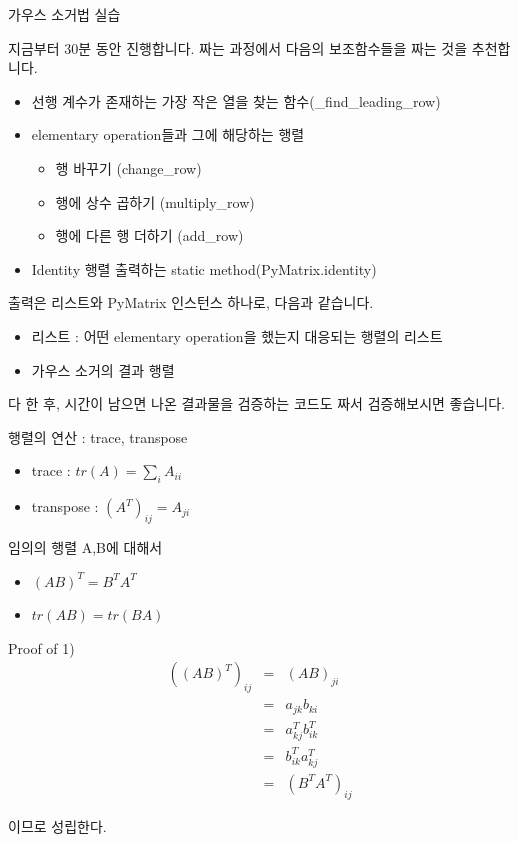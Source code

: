 \documentclass{beamer}
\begin{document}
\begin{frame}[allowframebreaks]{가우스 소거법 실습} 

지금부터 30분 동안 진행합니다. 짜는 과정에서 다음의 보조함수들을 짜는 것을 추천합니다. 

\begin{itemize} 
\item 선행 계수가 존재하는 가장 작은 열을 찾는 함수(\_find\_leading\_row)
\item elementary operation들과 그에 해당하는 행렬 
\begin{itemize} 
\item 행 바꾸기 (change\_row)
\item 행에 상수 곱하기 (multiply\_row)
\item 행에 다른 행 더하기 (add\_row)
\end{itemize}
\item Identity 행렬 출력하는 static method(PyMatrix.identity)
\end{itemize}

출력은 리스트와 PyMatrix 인스턴스 하나로, 다음과 같습니다. 

\begin{itemize} 
\item 리스트 : 어떤 elementary operation을 했는지 대응되는 행렬의 리스트
\item 가우스 소거의 결과 행렬 
\end{itemize}

다 한 후, 시간이 남으면 나온 결과물을 검증하는 코드도 짜서 검증해보시면 좋습니다. 

\end{frame}




\begin{frame}{행렬의 연산 : trace, transpose} 
\begin{itemize} 
\item trace : $tr(A) = \sum_i A_{ii}$
\item transpose : $(A^{T})_{ij} = A_{ji}$
\end{itemize}

임의의 행렬 A,B에 대해서 
\begin{itemize}
\item $(AB)^T = B^TA^T$
\item $tr(AB) = tr(BA)$
\end{itemize}  
\end{frame}

\begin{frame}{Proof of 1)} 
\begin{eqnarray}
((AB)^T)_{ij} &=& (AB)_{ji} \\
&=& a_{jk}b_{ki} \\
&=& a^T_{kj}b^T_{ik} \\
&=& b^T_{ik} a^T_{kj} \\
&=& (B^T A^T)_{ij}
\end{eqnarray}

이므로 성립한다. 
\end{frame}
\end{document}

